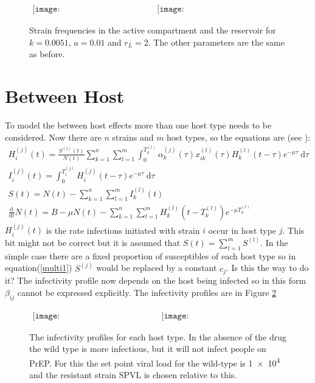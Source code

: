 \documentclass[DIV=15]{scrartcl}
\begin{document}
\begin{figure}[h]
 \begin{center}$
 \begin{array}{cc}
 \texttt{[image: WithinHostActive\_20\_04a.eps]} &
 \texttt{[image: WithinHostReservoir\_20\_04a.eps]}
 \end{array}$
 \end{center}
 \caption{Strain frequencies in the active compartment and the reservoir for $k = 0.0051$, $a = 0.01$ and $r_L = 2$. The other parameters are the same as before.}
 \label{freqwithres just 1}
 \end{figure}
 
\section*{Between  Host}
To model  the between host effects more than one host type needs to  be considered. Now there are $n$ strains and $m$ host types, so the equations are (see \cite{Lythgoe2013}): 
\begin{gather}
H^{(j)}_{i}(t) = \frac{S^{(j)}(t)}{N(t)}  \sum_{k=1}^n \sum_{l=1}^m  \int_0^{T^{(l)}_{k}} \alpha^{(j)}_{k}(\tau) x^{(l)}_{ik}(\tau) H^{(l)}_{k}(t-\tau)e^{-\mu \tau} \ \text{d}\tau \label{multi1} \\
I_i^{(j)}(t) = \int_0^{T_i^{(j)}}  H_i^{(j)}(t-\tau)e^{-\mu \tau} \  \text{d}\tau \\
S(t) = N(t) -  \sum_{k=1}^n \sum_{l=1}^m  I^{(l)}_k(t) \\
\frac{\text{d}}{\text{d} t}  N(t) = B- \mu N(t) -\sum_{k=1}^n \sum_{l=1}^m  H_k^{(l)}(t-T_k^{(l)})e^{-\mu T_k^{(l)}}
\end{gather}
$H^{(j)}_{i}(t)$ is the rate infections initiated with strain $i$ occur in host type $j$. This bit might not be correct but it is assumed that $S(t) =  \sum_{l=1}^m S^{(l)}$. In the simple case there are a fixed proportion of susceptibles of each host type so in equation(\ref{multi1}) $S^{(j)}$ would be replaced by  a constant $c_j$. Is this the way to do it? The infectivity profile now depends on the host being infected so in this form $\beta_{ij}$ cannot be expressed explicitly. The infectivity profiles are in Figure  \ref{Infectivity}
\begin{figure}[h]
 \begin{center}$
 \begin{array}{cc}
 \texttt{[image: Infectivity1\_20\_04a.eps]} &
 \texttt{[image: Infectivity2\_20\_04a.eps]}
 \end{array}$
 \end{center}
 \caption{The infectivity profiles for each host type. In the absence of the drug the wild type is more  infectious, but it will not infect people on PrEP. For this the set point viral load for  the wild-type  is \SI{1e4}{} and the resistant strain SPVL is chosen relative to this.}
 \label{Infectivity}
 \end{figure}
\end{document}
